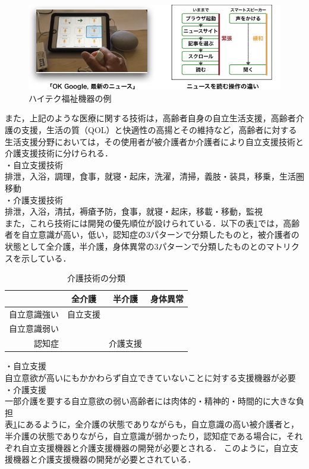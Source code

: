 \begin{figure}[htb]
 \begin{center}
 \includegraphics[scale=0.4]{figures/yubicommunication.png}
 \caption[ハイテク福祉機器の例]{ハイテク福祉機器の例 \label{yubicommnnication}}
 \end{center}
\end{figure}

また，上記のような医療に関する技術は，高齢者自身の自立生活支援，高齢者介護の支援，生活の質（QOL）と快適性の高揚とその維持など，高齢者に対する生活支援分野においては，その使用者が被介護者か介護者により自立支援技術と介護支援技術に分けられる．\\
・自立支援技術 \\
排泄，入浴，調理，食事，就寝・起床，洗濯，清掃，義肢・装具，移乗，生活圏移動 \\
・介護支援技術 \\
排泄，入浴，清拭，褥瘡予防，食事，就寝・起床，移載・移動，監視 \\
また，これら技術には開発の優先順位が設けられている．以下の表\ref{tech_classification}では，高齢者を自立意識が高い，低い，認知症の3パターンで分類したものと，被介護者の状態として全介護，半介護，身体異常の3パターンで分類したものとのマトリクスを示している．

\begin{table}[htb]
  \caption[介護技術の分類]{介護技術の分類}
  \label{tech_classification}
  \centering
  \begin{tabular}{r|c|c|c}
     & 全介護 & 半介護 & 身体異常 \\ \hline
    自立意識強い & 自立支援 & \quad & \quad \\
    自立意識弱い & \quad & \quad &  \quad \\
    認知症 & \quad & 介護支援 & \quad \\
    \end{tabular}
\end{table}

・自立支援 \\
自立意欲が高いにもかかわらず自立できていないことに対する支援機器が必要 \\
・介護支援 \\
一部介護を要する自立意欲の弱い高齢者には肉体的・精神的・時間的に大きな負担 \\
表\ref{tech_classification}にあるように，全介護の状態でありながらも，自立意識の高い被介護者と，半介護の状態でありながら，自立意識が弱かったり，認知症である場合に，それぞれ自立支援機器と介護支援機器の開発が必要とされる．
このように，自立支援機器と介護支援機器の開発が必要とされている．

